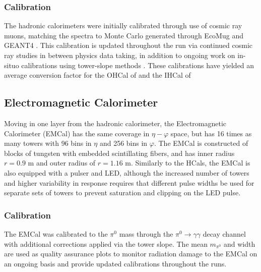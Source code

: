 		\subsubsection{Calibration}
			The hadronic calorimeters were initially calibrated through use of cosmic ray muons, matching the spectra to Monte Carlo 
			generated through EcoMug and GEANT4 \cite{HCal_Calib}. 
			This calibration is updated throughout the run via continued cosmic ray studies in between physics data taking, in addition
			to ongoing work on in-situo calibrations using tower-slope methods \cite{tower_slope_hcal}. 
			These calibrations have yielded an average conversion factor for the OHCal of and the IHCal of %
	\subsection{Electromagnetic Calorimeter}
		Moving in one layer from the hadronic calorimeter, the Electromagnetic Calorimeter (EMCal) has the same coverage in $\eta-\varphi$ space,
		but has 16 times as many towers with 96 bins in $\eta$ and 256 bins in $\varphi$. 
		The EMCal is constructed of blocks of tungsten with embedded scintillating fibers, 
		and has inner radius $r=0.9$ m and outer radius of $r=1.16$ m.
		Similarly to the HCals, the EMCal is also equipped with a pulser and LED, although the increased number of towers and higher variability 
		in response requires that different pulse widths be used for separate sets of towers to prevent saturation and clipping on the LED pulse.
		\subsubsection{Calibration}
			The EMCal was calibrated to the $\pi^0$ mass through the $\pi^0 \rightarrow \gamma \gamma$ decay channel with additional corrections
			applied via the tower slope. 
			The mean $m_{\pi^0}$ and width are used as quality assurance plots to monitor radiation damage to the EMCal on an ongoing basis and provide updated calibrations throughout the runs.


